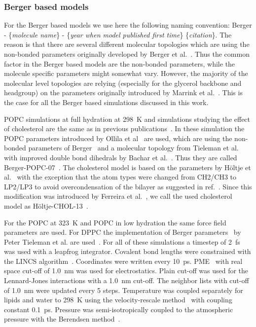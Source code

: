 \documentclass[pre,aps,floatfix,authordate1-4,twocolumn]{revtex4-1}
\begin{document}
\subsubsection{Berger based models}
For the Berger based models we use here the following naming convention: 
Berger - \{{\it molecule name}\} - \{{\it year when model published first time}\} \{{\it citation}\}.
The reason is that there are several different molecular topologies which are using the non-bonded parameters originally
developed by Berger et al.~\cite{berger97}. Thus the common factor in the Berger based models are the non-bonded parameters,
while the molecule specific parameters might somewhat vary. However, the majority of the molecular level topologies are 
relying (especially for the glycerol backbone and headgroup) on the parameters originally introduced by Marrink et al.~\cite{marrink98}.
This is the case for all the Berger based simulations discussed in this work.

POPC simulations at full hydration at 298~K and simulations studying the effect of cholesterol are the same as in previous publications~\cite{ferreira13,ferreira15}.
In these simulation the POPC parameters introduced by Ollila et al~\cite{ollila07a} are used, which are using the non-bonded parameters of Berger~\cite{berger97}
and a molecular topology from Tieleman et al.~\cite{tieleman99} with improved double bond dihedrals by Bachar et al.~\cite{bachar04}. 
Thus they are called Berger-POPC-07~\cite{ollila07a}. The cholesterol model is based on the parameters by H\"oltje et al.~\cite{holtje01} with the
exception that the atom types were changed from CH2/CH3 to LP2/LP3 to avoid overcondensation of the bilayer as suggested in ref.~\cite{tieleman06}.
Since this modification was introduced by Ferreira et al.~\cite{ferreira13}, we call the used cholesterol model as H\"oltje-CHOL-13~\cite{ferreira13}.

For the POPC at 323~K and POPC in low hydration the same force field parameters are used.
For DPPC the implementation of Berger parameters~\cite{berger97} by Peter Tieleman et al. are used~\cite{marrink98}.
For all of these simulations a timestep of 2~fs was used with a leapfrog integrator. Covalent bond lengths were constrained with the LINCS algorithm~\cite{hess97,hess07}. 
Coordinates were written every 10~ps. PME~\cite{darden93,essman95} with real space cut-off of 1.0~nm was used 
for electrostatics. Plain cut-off was used for the Lennard-Jones interactions with a 1.0~nm cut-off.
The neighbor lists with cut-off of 1.0~nm were updated every 5 steps. Temperature was coupled separately
for lipids and water to 298~K using the velocity-rescale method~\cite{bussi07} with coupling constant 0.1~ps.
Pressure was semi-isotropically coupled to the atmospheric pressure with the Berendsen method~\cite{berendsen84}.
\end{document}
